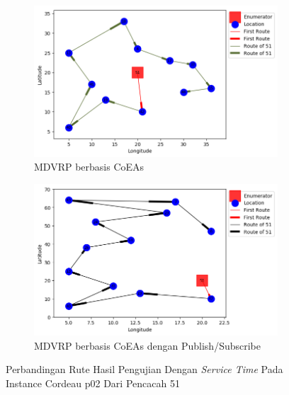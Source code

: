 \begin{figure}[H]
	\centering
	\begin{subfigure}[t]{\textwidth}
		\centering
		\includegraphics[width=\textwidth]{Resources/Images/cordeau_p02_tw/cordeau_p02_tw_51_coes}
		\caption{MDVRP berbasis CoEAs}
		\label{fig:cordeau_p02_tw_51_coes}
	\end{subfigure}
	\begin{subfigure}[t]{\textwidth}
		\centering
		\includegraphics[width=\textwidth]{Resources/Images/cordeau_p02_tw/cordeau_p02_tw_51_pubsub_coes}
		\caption{MDVRP berbasis CoEAs dengan Publish/Subscribe}
		\label{fig:cordeau_p02_tw_51_pubsub_coes}
	\end{subfigure}
	\caption{Perbandingan Rute Hasil Pengujian Dengan \textit{Service Time} Pada Instance Cordeau p02 Dari Pencacah 51}
	\label{fig:cordeau_p02_tw_51}
\end{figure}


